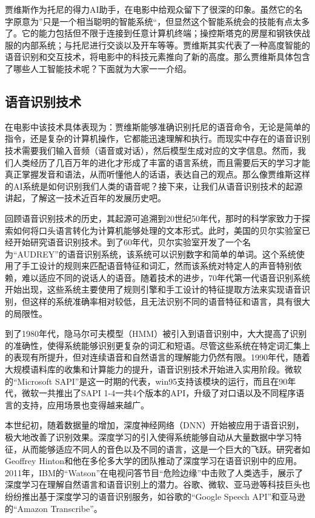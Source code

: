贾维斯作为托尼的得力AI助手，在电影中给观众留下了很深的印象。虽然它的名字原意为”只是一个相当聪明的智能系统“，但显然这个智能系统会的技能有点太多了。它的能力包括但不限于连接到任意计算机终端；操控斯塔克的房屋和钢铁侠战服的内部系统；与托尼进行交谈以及开车等等。贾维斯其实代表了一种高度智能的语音识别和交互技术，将电影中的科技元素推向了新的高度。那么贾维斯具体包含了哪些人工智能技术呢？下面就为大家一一介绍。

\subsection{语音识别技术}

在电影中该技术具体表现为：贾维斯能够准确识别托尼的语音命令，无论是简单的指令，还是复杂的计算机操作，它都能迅速理解和执行。而现实中存在的语音识别技术需要我们输入音频（语音或对话），然后模型生成对应的文字信息。然而，我们人类经历了几百万年的进化才形成了丰富的语言系统，而且需要后天的学习才能真正掌握发音和语法，从而听懂他人的话语，表达自己的观点。那么像贾维斯这样的AI系统是如何识别我们人类的语音呢？接下来，让我们从语音识别技术的起源讲起，了解这一技术近百年的发展历史吧。

回顾语音识别技术的历史，其起源可追溯到20世纪50年代，那时的科学家致力于探索如何将口头语言转化为计算机能够处理的文本形式。此时，美国的贝尔实验室已经开始研究语音识别技术。到了60年代，贝尔实验室开发了一个名为“AUDREY”的语音识别系统，该系统可以识别数字和简单的单词。这个系统使用了手工设计的规则来匹配语音特征和词汇，然而该系统对特定人的声音特别依赖，难以适应不同的说话人的语音。随着技术的进步，70年代第一代语音识别系统开始出现，这些系统主要使用了规则引擎和手工设计的特征提取方法来实现语音识别，但这样的系统准确率相对较低，且无法识别不同的语音特征和语言，具有很大的局限性。

到了1980年代，隐马尔可夫模型（HMM）被引入到语音识别中，大大提高了识别的准确性，使得系统能够识别更复杂的词汇和短语。尽管这些系统在特定词汇集上的表现有所提升，但对连续语音和自然语言的理解能力仍然有限。1990年代，随着大规模语料库的收集和计算能力的提升，语音识别技术开始进入实用阶段。微软的“Microsoft SAPI”是这一时期的代表，win95支持该模块的运行，而且在90年代，微软一共推出了SAPI 1-4一共4个版本的API，升级了对口语以及不同程序语言的支持，应用场景也变得越来越广。

本世纪初，随着数据量的增加，深度神经网络（DNN）开始被应用于语音识别，极大地改善了识别效果。深度学习的引入使得系统能够自动从大量数据中学习特征，从而能够适应不同人的音色以及不同的语言，这是一个巨大的飞跃。研究者如Geoffrey Hinton和他在多伦多大学的团队推动了深度学习在语音识别中的应用。2011年，IBM的“Watson”在电视问答节目“危险边缘”中击败了人类选手，展示了深度学习在理解自然语言和语音识别上的潜力。谷歌、微软、亚马逊等科技巨头也纷纷推出基于深度学习的语音识别服务，如谷歌的“Google Speech API”和亚马逊的“Amazon Transcribe”。

